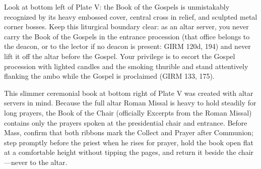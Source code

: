 \label{pc-obj-book-of-the-gospels}
Look at bottom left of Plate V: the Book of the Gospels is unmistakably recognized by its heavy embossed cover, central cross in relief, and sculpted metal corner bosses. Keep this liturgical boundary clear: as an altar server, you never carry the Book of the Gospels in the entrance procession (that office belongs to the deacon, or to the lector if no deacon is present: GIRM 120d, 194) and never lift it off the altar before the Gospel. Your privilege is to escort the Gospel procession with lighted candles and the smoking thurible and stand attentively flanking the ambo while the Gospel is proclaimed (GIRM 133, 175).

\PCDEntryRule

\label{pc-obj-book-of-the-chair}
This slimmer ceremonial book at bottom right of Plate V was created with altar servers in mind. Because the full altar Roman Missal is heavy to hold steadily for long prayers, the Book of the Chair (officially Excerpts from the Roman Missal) contains only the prayers spoken at the presidential chair and entrance. Before Mass, confirm that both ribbons mark the Collect and Prayer after Communion; step promptly before the priest when he rises for prayer, hold the book open flat at a comfortable height without tipping the pages, and return it beside the chair---never to the altar.


